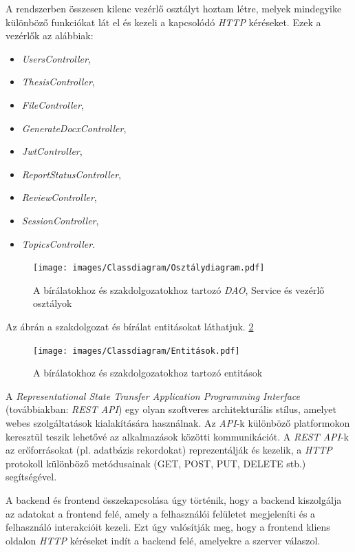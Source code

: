 A rendszerben összesen kilenc vezérlő osztályt hoztam létre, melyek mindegyike különböző funkciókat lát el és kezeli a kapcsolódó \textit{HTTP} kéréseket. Ezek a vezérlők az alábbiak:
\begin{itemize}

\item{\textit{UsersController}},
\item{\textit{ThesisController}},
\item{\textit{FileController}},
\item{\textit{GenerateDocxController}},
\item{\textit{JwtController}},
\item{\textit{ReportStatusController}},
\item{\textit{ReviewController}},
\item{\textit{SessionController}},
\item{\textit{TopicsController}}.

\end{itemize}

\begin{figure}[ht]
	\texttt{[image: images/Classdiagram/Osztálydiagram.pdf]}
	\caption{A bírálatokhoz és szakdolgozatokhoz tartozó \textit{DAO}, Service és vezérlő osztályok}
	\label{fig:Osztálydiagram}
\end{figure}
Az ábrán a szakdolgozat és bírálat entitásokat láthatjuk. \ref{fig:Entitások}
\begin{figure}[h!]
	\texttt{[image: images/Classdiagram/Entitások.pdf]}
	\caption{A bírálatokhoz és szakdolgozatokhoz tartozó entitások}
	\label{fig:Entitások}
\end{figure}


A \textit{Representational State Transfer Application Programming Interface} (továbbiakban: \textit{REST API}) \cite{REST API} egy olyan szoftveres architekturális stílus, amelyet webes szolgáltatások kialakítására használnak. Az \textit{API}-k különböző platformokon keresztül teszik lehetővé az alkalmazások közötti kommunikációt. A \textit{REST API}-k \cite{REST API} az erőforrásokat (pl. adatbázis rekordokat) reprezentálják és kezelik, a \textit{HTTP} \cite{http} protokoll különböző metódusainak (GET, POST, PUT, DELETE stb.) segítségével.

A backend és frontend összekapcsolása úgy történik, hogy a backend kiszolgálja az adatokat a frontend felé, amely a felhasználói felületet megjeleníti és a felhasználó interakcióit kezeli. Ezt úgy valósítják meg, hogy a frontend kliens oldalon \textit{HTTP} kéréseket indít a backend felé, amelyekre a szerver válaszol.\\

